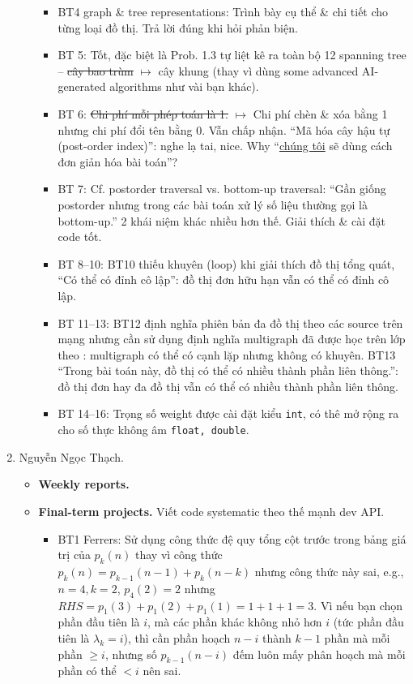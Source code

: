 \documentclass{article}
\begin{document}
\begin{enumerate}
\begin{itemize}
\begin{itemize}
            \item BT4 graph \& tree representations: Trình bày cụ thể \& chi tiết cho từng loại đồ thị. Trả lời đúng khi hỏi phản biện.
            \item BT 5: Tốt, đặc biệt là Prob. 1.3 tự liệt kê ra toàn bộ 12 spanning tree -- \st{cây bao trùm} $\mapsto$ cây khung (thay  vì dùng some advanced AI-generated algorithms như vài bạn khác).
            \item BT 6: \st{Chi phí mỗi phép toán là 1.} $\mapsto$ Chi phí chèn \& xóa bằng 1 nhưng chi phí đổi tên bằng 0. Vẫn chấp nhận. ``Mã hóa cây hậu tự (post-order index)'': nghe lạ tai, nice. Why ``\underline{chúng tôi} sẽ dùng cách đơn giản hóa bài toán''?
            \item BT 7: Cf. postorder traversal vs. bottom-up traversal: ``Gần giống postorder nhưng trong các bài toán xử lý số liệu thường gọi là bottom-up.'' 2 khái niệm khác nhiều hơn thế. Giải thích \& cài đặt code tốt.
            \item BT 8--10: BT10 thiếu khuyên (loop) khi giải thích đồ thị tổng quát, ``Có thể có đỉnh cô lập'': đồ thị đơn hữu hạn vẫn có thể có đỉnh cô lập.
            \item BT 11--13: BT12 định nghĩa phiên bản đa đồ thị theo các source trên mạng nhưng cần sử dụng định nghĩa multigraph đã được học trên lớp theo \cite{Shahriari2022}: multigraph có thể có cạnh lặp nhưng không có khuyên. BT13 ``Trong bài toán này, đồ thị có thể có nhiều thành phần liên thông.'': đồ thị đơn hay đa đồ thị vẫn có thể có nhiều thành phần liên thông.
            \item BT 14--16: Trọng số weight được cài đặt kiểu {\tt int}, có thê mở rộng ra cho số thực không âm {\tt float, double}.
        \end{itemize}
    \end{itemize}
    \item {\sc Nguyễn Ngọc Thạch.}
    \begin{itemize}
        \item {\bf Weekly reports.}
        \item {\bf Final-term projects.} Viết code systematic theo thế mạnh dev API.
        \begin{itemize}
            \item BT1 Ferrers: Sử dụng công thức đệ quy tổng cột trước trong bảng giá trị của $p_k(n)$ thay vì công thức $p_k(n) = p_{k-1}(n - 1) + p_k(n - k)$ nhưng công thức này sai, e.g., $n = 4,k = 2$, $p_4(2) = 2$ nhưng $RHS = p_1(3) + p_1(2) + p_1(1) = 1 + 1 + 1 = 3$. Vì nếu bạn chọn phần đầu tiên là $i$, mà các phần khác không nhỏ hơn $i$ (tức phần đầu tiên là $\lambda_k = i$), thì cần phần hoạch $n - i$ thành $k - 1$ phần mà mỗi phần  $\ge i$, nhưng số $p_{k-1}(n - i)$ đếm luôn mấy phân hoạch mà mỗi phần có thể $< i$ nên sai.

\end{itemize}
\end{itemize}
\end{enumerate}
\end{document}
